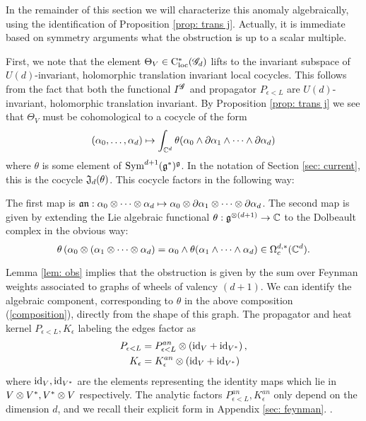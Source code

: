 In the remainder of this section we will characterize this anomaly algebraically, using the identification of Proposition \ref{prop: trans j}. 
Actually, it is immediate based on symmetry arguments what the obstruction is up to a scalar multiple. 

First, we note that the element $\Theta_V \in {\rm C}_{\rm loc}^*(\mathscr G_d)$ lifts to the invariant subspace of $U(d)$-invariant, holomorphic translation invariant local cocycles.
This follows from the fact that both the functional $I^{\mathscr G}$ and propagator $P_{\epsilon<L}$ are $U(d)$-invariant, holomorphic translation invariant.
By Proposition \ref{prop: trans j} we see that $\Theta_V$ must be cohomological to a cocycle of the form
\[
(\alpha_0, \ldots, \alpha_d) \mapsto \int_{\mathbb C^d} \theta(\alpha_0 \wedge \partial \alpha_1 \wedge \cdots \wedge \partial \alpha_d) 
\]
where $\theta$ is some element of ${\rm Sym}^{d+1}(\mathfrak g^*)^\mathfrak g$.
In the notation of Section \ref{sec: current}, this is the cocycle $\mathfrak J_d (\theta)$. 
This cocycle factors in the following way:
\beqn
\label{composition}
\eeqn
The first map is $\mathfrak a \mathfrak n : \alpha_0 \otimes \cdots \otimes \alpha_d \mapsto \alpha_0 \otimes \partial \alpha_1 \otimes \cdots \otimes \partial \alpha_d$.
The second map is given by extending the Lie algebraic functional $\theta : \mathfrak g^{\otimes (d+1)} \to \mathbb C$ to the Dolbeault complex in the obvious way:
\[
\theta \left(\alpha_0 \otimes (\alpha_1 \otimes \cdots \otimes \alpha_d\right) = \alpha_0 \wedge \theta(\alpha_1 \wedge \cdots \wedge \alpha_d) \in \Omega^{d,*}_c(\mathbb C^d).
\]

Lemma \ref{lem: obs} implies that the obstruction is given by the sum over Feynman weights associated to graphs of wheels of valency $(d+1)$.
We can identify the algebraic component, corresponding to $\theta$ in the above composition (\ref{composition}), directly from the shape of this graph. 
The propagator and heat kernel $P_{\epsilon<L}, K_\epsilon$ labeling the edges factor as
\begin{align*}
P_{\epsilon<L} &= P^{an}_{\epsilon<L} \otimes \left({\rm id}_{V} + {\rm id}_{V^*}\right),\\ 
K_{\epsilon} &= K_{\epsilon}^{an} \otimes \left({\rm id}_{V} + {\rm id}_{V^*}\right)
\end{align*}
where ${\rm id}_V, {\rm id}_{V^*}$ are the elements representing the identity maps which lie in $V \otimes V^*, V^* \otimes V$ respectively. 
The analytic factors $P^{an}_{\epsilon<L},  K_{\epsilon}^{an}$ only depend on the dimension $d$, and we recall their explicit form in Appendix \ref{sec: feynman}. . 

